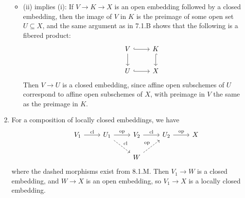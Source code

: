 \documentclass{report}
\begin{document}
\begin{enumerate}[label=\textbf{8.1.\Alph*.}]
\begin{itemize}
		      \item (ii) implies (i): If $V\to K\to X$ is an open embedding
		            followed by a closed embedding, then the image of $V$ in $K$
		            is the preimage of some open set $U\subseteq X$, and the same
		            argument as in 7.1.B shows that the following is a fibered
		            product:
		            \begin{equation*}
			            \begin{tikzcd}
				            &V \ar[d] \ar[r,hook] &K \ar[d,hook] \\
				            &U \ar[r,hook] &X
			            \end{tikzcd}
		            \end{equation*}
		            Then $V\to U$ is a closed embedding, since affine open
		            subschemes of $U$ correspond to affine open subschemes of $X$,
		            with preimage in $V$ the same as the preimage in $K$.
	      \end{itemize}

	\item For a composition of locally closed embeddings, we have
	      \begin{equation*}
		      \begin{tikzcd}
			      &V_1 \ar[r,"\text{cl}"] &U_1 \ar[r,"\text{op}"] \ar[dr,dashed,"\text{cl}"]
			      &V_2 \ar[r,"\text{cl}"] &U_2 \ar[r,"\text{op}"] &X \\
			      & & &W \ar[ur,dashed,"\text{op}"]&
		      \end{tikzcd}
	      \end{equation*}
	      where the dashed morphisms exist from 8.1.M. Then $V_1\to W$ is a
	      closed embedding, and $W\to X$ is an open embedding, so $V_1\to X$ is
	      a locally closed embedding.
\end{enumerate}
\end{document}
